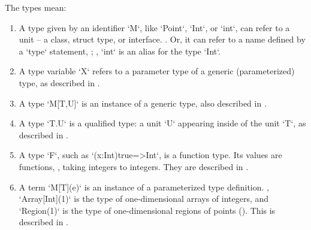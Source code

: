 The types mean: 
\begin{enumerate}
\item A type given by an identifier \xcd`M`, like \xcd`Point`, \xcd`Int`, or
      \xcd`int`, can refer to a unit -- a class, struct type, or interface.
      .
      Or, it can refer to a name defined by a \xcd`type` statement,
      ; \eg, \xcd`int` is an alias for the type \xcd`Int`. 
\item A type variable \xcd`X` refers to a parameter type of a generic
      (parameterized) type, as described in .
\item A type \xcd`M[T,U]` is an instance of a generic type, also described in 
      .
\item A type \xcd`T.U` is a qualified type: a unit \xcd`U` appearing inside of
      the unit \xcd`T`, as described in .
\item A type \xcd`F`, such as \xcd`(x:Int){true}=>Int`, is a function type.
      Its values are functions, \eg, taking integers to integers. They are
      described in .
\item A term \xcd`M[T](e)` is an instance of a parameterized type definition.  
      \eg, \xcd`Array[Int](1)` is the type of one-dimensional arrays of
      integers, and \xcd`Region(1)` is the type of one-dimensional regions of
      points ().  
      This is described in .
\end{enumerate}
